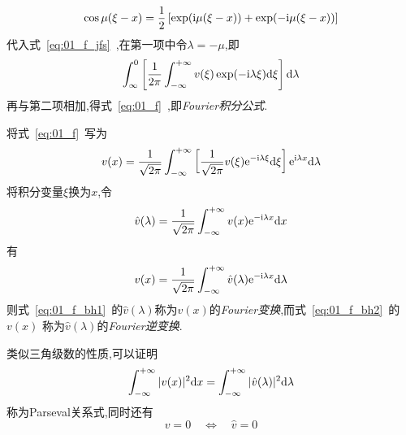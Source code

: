 \begin{equation*}
 \cos\mu(\xi-x)=\dfrac{1}{2}\left[\exp(\mathrm{i}\mu(\xi-x))+\exp(-\mathrm{i}\mu(\xi-x))\right]
\end{equation*}
代入式~\eqref{eq:01_f_jfs}~,在第一项中令$\lambda=-\mu$,即
\begin{equation*}
 \int_{\infty}^{0}\left[\dfrac{1}{2\pi}\int_{-\infty}^{+\infty} v(\xi)\exp(-\mathrm{i}\lambda\xi)\mathrm{d}\xi\right]\mathrm{d}\lambda
\end{equation*}
再与第二项相加,得式~\eqref{eq:01_f}~,即\emph{Fourier积分公式}.\par
将式~\eqref{eq:01_f}~写为
\begin{equation*}
 v(x)=\dfrac{1}{\sqrt{2\pi}}\int_{-\infty}^{+\infty}\left[\dfrac{1}{\sqrt{2\pi}}
 v(\xi)\mathrm{e}^{-\mathrm{i}\lambda\xi}\mathrm{d}\xi\right]\mathrm{e}^{\mathrm{i}\lambda x}\mathrm{d}\lambda
\end{equation*}
将积分变量$\xi$换为$x$,令
\begin{equation}\label{eq:01_f_bh1}
 \hat{v}(\lambda)=\dfrac{1}{\sqrt{2\pi}}\int_{-\infty}^{+\infty}v(x)\mathrm{e}^{-\mathrm{i}\lambda x}\mathrm{d} x
\end{equation}
有
\begin{equation}\label{eq:01_f_bh2}
 v(x)=\dfrac{1}{\sqrt{2\pi}}\int_{-\infty}^{+\infty}\hat{v}(\lambda)\mathrm{e}^{-\mathrm{i}\lambda x}\mathrm{d}\lambda
\end{equation}
则式~\eqref{eq:01_f_bh1}~的$\hat{v}(\lambda)$称为$v(x)$的\emph{Fourier变换},而式~\eqref{eq:01_f_bh2}~的$v(x)$
称为$\hat{v}(\lambda)$的\emph{Fourier逆变换}.\par
类似三角级数的性质,可以证明
\begin{equation}
 \int_{-\infty}^{+\infty}|v(x)|^2\mathrm{d} x=\int_{-\infty}^{+\infty}|\hat{v}(\lambda)|^2\mathrm{d}\lambda
\end{equation}
称为Parseval关系式,同时还有
\begin{equation}
 v=0\quad\Leftrightarrow\quad \hat{v}=0
\end{equation}
